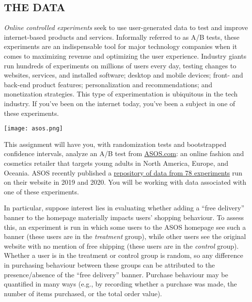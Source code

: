 \documentclass[
]{article}
\begin{document}
\newpage

\hypertarget{the-data}{%
\subsection{THE DATA}\label{the-data}}

\emph{Online controlled experiments} seek to use user-generated data to
test and improve internet-based products and services. Informally
referred to as A/B tests, these experiments are an indispensable tool
for major technology companies when it comes to maximizing revenue and
optimizing the user experience. Industry giants run hundreds of
experiments on millions of users every day, testing changes to websites,
services, and installed software; desktop and mobile devices; front- and
back-end product features; personalization and recommendations; and
monetization strategies. This type of experimentation is ubiquitous in
the tech industry. If you've been on the internet today, you've been a
subject in one of these experiments.

\begin{center}
\texttt{[image: asos.png]}
\end{center}

This assignment will have you, with randomization tests and bootstrapped
confidence intervals, analyze an A/B test from
\href{https://www.asos.com/}{ASOS.com}: an online fashion and cosmetics
retailer that targets young adults in North America, Europe, and
Oceania. ASOS recently published a
\href{https://osf.io/64jsb/}{repository of data from 78 experiments} run
on their website in 2019 and 2020. You will be working with data
associated with one of these experiments.

In particular, suppose interest lies in evaluating whether adding a
``free delivery'' banner to the homepage materially impacts users'
shopping behaviour. To assess this, an experiment is run in which some
users to the ASOS homepage see such a banner (these users are in the
\emph{treatment} group), while other users see the original website with
no mention of free shipping (these users are in the \emph{control}
group). Whether a user is in the treatment or control group is random,
so any difference in purchasing behaviour between these groups can be
attributed to the presence/absence of the ``free delivery'' banner.
Purchase behaviour may be quantified in many ways (e.g., by recording
whether a purchase was made, the number of items purchased, or the total
order value).
\end{document}
